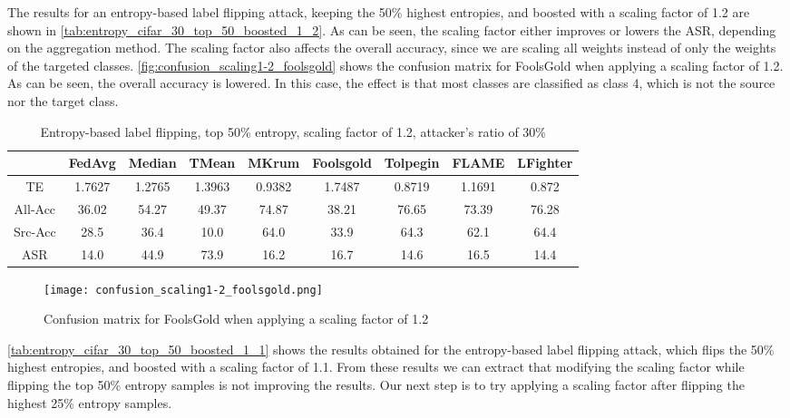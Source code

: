 The results for an entropy-based label flipping attack, keeping the 50\% highest entropies, and boosted with a scaling factor of 1.2 are shown in \autoref{tab:entropy_cifar_30_top_50_boosted_1_2}.
As can be seen, the scaling factor either improves or lowers the ASR, depending on the aggregation method. 
The scaling factor also affects the overall accuracy, since we are scaling all weights instead of only the weights of the targeted classes. \autoref{fig:confusion_scaling1-2_foolsgold} shows the confusion matrix for FoolsGold when applying a scaling factor of 1.2. As can be seen, the overall accuracy is lowered. In this case, the effect is that most classes are classified as class 4, which is not the source nor the target class.
\begin{table}[h!]
        \centering
        \small
        \begin{adjustbox}{center}
        \begin{tabular}{|c|c|c|c|c|c|c|c|c|}
            \hline
            & FedAvg & Median & TMean & MKrum & Foolsgold & Tolpegin & FLAME & LFighter \\
            \hline
            TE & 1.7627 & 1.2765 & 1.3963 & 0.9382 & 1.7487 & 0.8719 & 1.1691 & 0.872 \\
            \hline
            All-Acc & 36.02 & 54.27 & 49.37 & 74.87 & 38.21 & 76.65 & 73.39 & 76.28 \\
            \hline
            Src-Acc & 28.5 & 36.4 & 10.0 & 64.0 & 33.9 & 64.3 & 62.1 & 64.4 \\
            \hline
            ASR & 14.0 & 44.9 & 73.9 & 16.2 & 16.7 & 14.6 & 16.5 & 14.4 \\
            \hline
        \end{tabular}
        \end{adjustbox}
        \caption{Entropy-based label flipping, top 50\% entropy, scaling factor of 1.2, attacker's ratio of 30\%}
        \label{tab:entropy_cifar_30_top_50_boosted_1_2}
    \end{table}
    

\begin{figure}[h!]
        \centering
        \texttt{[image: confusion\_scaling1-2\_foolsgold.png]}
        \caption{Confusion matrix for FoolsGold when applying a scaling factor of 1.2}
        \label{fig:confusion_scaling1-2_foolsgold}
\end{figure}

\autoref{tab:entropy_cifar_30_top_50_boosted_1_1} shows the results obtained for the entropy-based label flipping attack, which flips the 50\% highest entropies, and boosted with a scaling factor of 1.1. From these results we can extract that modifying the scaling factor while flipping the top 50\% entropy samples is not improving the results. Our next step is to try applying a scaling factor after flipping the highest 25\% entropy samples.

